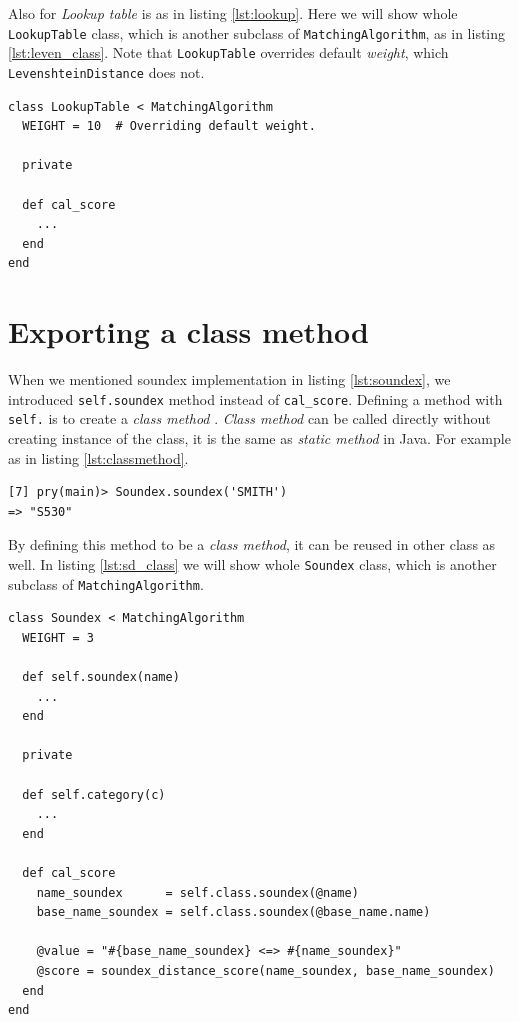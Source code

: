 Also for \emph{Lookup table} is as in listing \ref{lst:lookup}.
Here we will show whole \texttt{LookupTable} class,
which is another subclass of \texttt{MatchingAlgorithm}, as in listing \ref{lst:leven_class}.
Note that \texttt{LookupTable} overrides default \emph{weight}, which
\texttt{LevenshteinDistance} does not.

\begin{minipage}{\linewidth}
\begin{lstlisting}[label={lst:lt_class}, caption={\texttt{LookupTable} class.}]
class LookupTable < MatchingAlgorithm
  WEIGHT = 10  # Overriding default weight.

  private

  def cal_score
    ...
  end
end
\end{lstlisting}
\end{minipage}

\section{Exporting a class method}

When we mentioned soundex implementation in listing \ref{lst:soundex},
we introduced \texttt{self.soundex} method instead of \texttt{cal\_score}.
Defining a method with \texttt{self.} is to create a \emph{class method} \cite[]{classmethod}.
\emph{Class method} can be called directly without creating instance of the class,
it is the same as \emph{static method} in Java. For example as in listing
\ref{lst:classmethod}.

\begin{minipage}{\linewidth}
\begin{lstlisting}[label={lst:classmethod}, caption={Calling class method \emph{Soundex.soundex}.}]
[7] pry(main)> Soundex.soundex('SMITH')
=> "S530"
\end{lstlisting}
\end{minipage}

By defining this method to be a \emph{class method}, it can be reused
in other class as well. In listing \ref{lst:sd_class} we will show whole
\texttt{Soundex} class, which is another subclass of \texttt{MatchingAlgorithm}.

\begin{minipage}{\linewidth}
\begin{lstlisting}[label={lst:sd_class}, caption={\texttt{Soundex} class.}]
class Soundex < MatchingAlgorithm
  WEIGHT = 3

  def self.soundex(name)
    ...
  end

  private

  def self.category(c)
    ...
  end

  def cal_score
    name_soundex      = self.class.soundex(@name)
    base_name_soundex = self.class.soundex(@base_name.name)

    @value = "#{base_name_soundex} <=> #{name_soundex}"
    @score = soundex_distance_score(name_soundex, base_name_soundex)
  end
end
\end{lstlisting}
\end{minipage}

